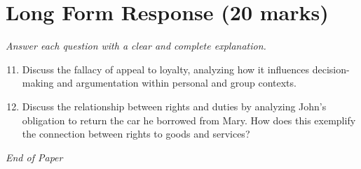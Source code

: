 \documentclass[12pt]{article}
\begin{document}
\section*{Long Form Response (20 marks)}
\textit{Answer each question with a clear and complete explanation.}
\begin{enumerate}[label=\arabic*.]
\setcounter{enumi}{10}
\item Discuss the fallacy of appeal to loyalty, analyzing how it influences decision-making and argumentation within personal and group contexts.
\item Discuss the relationship between rights and duties by analyzing John's obligation to return the car he borrowed from Mary. How does this exemplify the connection between rights to goods and services?
\end{enumerate}

\vfill
\noindent\textit{End of Paper}
\end{document}
